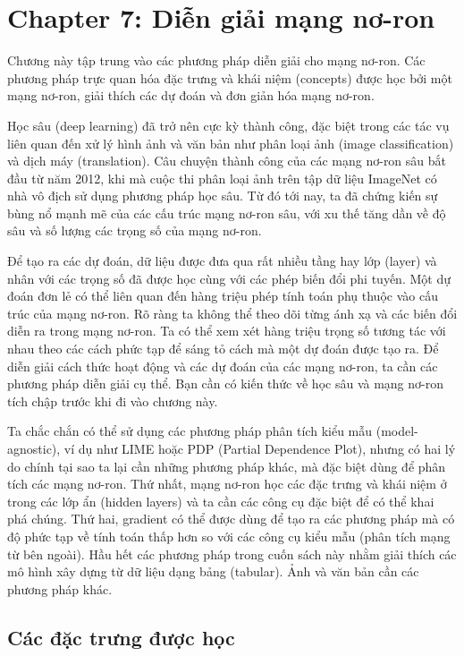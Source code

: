 \chapter*{Chapter 7: Diễn giải mạng nơ-ron}

Chương này tập trung vào các phương pháp diễn giải cho mạng nơ-ron. Các phương pháp trực quan hóa đặc trưng và khái niệm (concepts) được học bởi một mạng nơ-ron, giải thích các dự đoán và đơn giản hóa mạng nơ-ron.

Học sâu (deep learning) đã trở nên cực kỳ thành công, đặc biệt trong các tác vụ liên quan đến xử lý hình ảnh và văn bản như phân loại ảnh (image classification) và dịch máy (translation). Câu chuyện thành công của các mạng nơ-ron sâu bắt đầu từ năm 2012, khi mà cuộc thi phân loại ảnh trên tập dữ liệu ImageNet có nhà vô địch sử dụng phương pháp học sâu. Từ đó tới nay, ta đã chứng kiến sự bùng nổ mạnh mẽ của các cấu trúc mạng nơ-ron sâu, với xu thế tăng dần về độ sâu và số lượng các trọng số của mạng nơ-ron.

Để tạo ra các dự đoán, dữ liệu được đưa qua rất nhiều tầng hay lớp (layer) và nhân với các trọng số đã được học cùng với các phép biến đổi phi tuyến. Một dự đoán đơn lẻ có thể liên quan đến hàng triệu phép tính toán phụ thuộc vào cấu trúc của mạng nơ-ron. Rõ ràng ta không thể theo dõi từng ánh xạ và các biến đổi diễn ra trong mạng nơ-ron. Ta có thể xem xét hàng triệu trọng số tương tác với nhau theo các cách phức tạp để sáng tỏ cách mà một dự đoán được tạo ra. Để diễn giải cách thức hoạt động và các dự đoán của các mạng nơ-ron, ta cần các phương pháp diễn giải cụ thể. Bạn cần có kiến thức về học sâu và mạng nơ-ron tích chập trước khi đi vào chương này.

Ta chắc chắn có thể sử dụng các phương pháp phân tích kiểu mẫu (model-agnostic), ví dụ như LIME hoặc PDP (Partial Dependence Plot), nhưng có hai lý do chính tại sao ta lại cần những phương pháp khác, mà đặc biệt dùng để phân tích các mạng nơ-ron. Thứ nhất, mạng nơ-ron học các đặc trưng và khái niệm ở trong các lớp ẩn (hidden layers) và ta cần các công cụ đặc biệt để có thể khai phá chúng. Thứ hai, gradient có thể được dùng để tạo ra các phương pháp mà có độ phức tạp về tính toán thấp hơn so với các công cụ kiểu mẫu (phân tích mạng từ bên ngoài). Hầu hết các phương pháp trong cuốn sách này nhằm giải thích các mô hình xây dựng từ dữ liệu dạng bảng (tabular). Ảnh và văn bản cần các phương pháp khác.


\section{Các đặc trưng được học}

